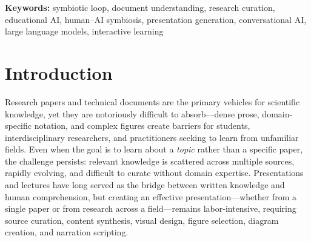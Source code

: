 \documentclass[11pt,a4paper]{article}
\begin{document}
\noindent\textbf{Keywords:} symbiotic loop, document understanding, research curation, educational AI, human--AI symbiosis, presentation generation, conversational AI, large language models, interactive learning

\newpage
\section{Introduction}
\label{sec:intro}

Research papers and technical documents are the primary vehicles for scientific knowledge, yet they are notoriously difficult to absorb---dense prose, domain-specific notation, and complex figures create barriers for students, interdisciplinary researchers, and practitioners seeking to learn from unfamiliar fields.
Even when the goal is to learn about a \emph{topic} rather than a specific paper, the challenge persists: relevant knowledge is scattered across multiple sources, rapidly evolving, and difficult to curate without domain expertise.
Presentations and lectures have long served as the bridge between written knowledge and human comprehension, but creating an effective presentation---whether from a single paper or from research across a field---remains labor-intensive, requiring source curation, content synthesis, visual design, figure selection, diagram creation, and narration scripting.
\end{document}
